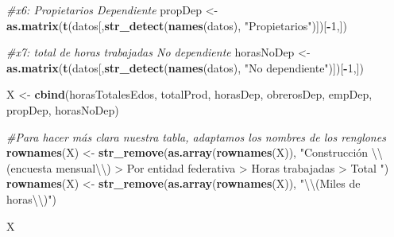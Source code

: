 \documentclass[
]{article}
\newenvironment{Shaded}{\begin{snugshade}}{\end{snugshade}}
\newcommand{\CharTok}[1]{\textcolor[rgb]{0.31,0.60,0.02}{#1}}
\newcommand{\CommentTok}[1]{\textcolor[rgb]{0.56,0.35,0.01}{\textit{#1}}}
\newcommand{\DecValTok}[1]{\textcolor[rgb]{0.00,0.00,0.81}{#1}}
\newcommand{\KeywordTok}[1]{\textcolor[rgb]{0.13,0.29,0.53}{\textbf{#1}}}
\newcommand{\NormalTok}[1]{#1}
\newcommand{\OperatorTok}[1]{\textcolor[rgb]{0.81,0.36,0.00}{\textbf{#1}}}
\newcommand{\StringTok}[1]{\textcolor[rgb]{0.31,0.60,0.02}{#1}}
\begin{document}
\begin{Shaded}
\begin{Highlighting}[]
\CommentTok{#x6: Propietarios Dependiente}
\NormalTok{propDep <-}\StringTok{ }\KeywordTok{as.matrix}\NormalTok{(}\KeywordTok{t}\NormalTok{(datos[,}\KeywordTok{str_detect}\NormalTok{(}\KeywordTok{names}\NormalTok{(datos), }\StringTok{"Propietarios"}\NormalTok{)])[}\OperatorTok{-}\DecValTok{1}\NormalTok{,])}

\CommentTok{#x7: total de horas trabajadas No dependiente}
\NormalTok{horasNoDep <-}\StringTok{ }\KeywordTok{as.matrix}\NormalTok{(}\KeywordTok{t}\NormalTok{(datos[,}\KeywordTok{str_detect}\NormalTok{(}\KeywordTok{names}\NormalTok{(datos), }\StringTok{"No dependiente"}\NormalTok{)])[}\OperatorTok{-}\DecValTok{1}\NormalTok{,])}

\NormalTok{X <-}\StringTok{ }\KeywordTok{cbind}\NormalTok{(horasTotalesEdos, totalProd, horasDep, obrerosDep, empDep, propDep, horasNoDep)}

\CommentTok{#Para hacer más clara nuestra tabla, adaptamos los nombres de los renglones}
\KeywordTok{rownames}\NormalTok{(X) <-}\StringTok{ }\KeywordTok{str_remove}\NormalTok{(}\KeywordTok{as.array}\NormalTok{(}\KeywordTok{rownames}\NormalTok{(X)), }\StringTok{"Construcción }\CharTok{\textbackslash{}\textbackslash{}}\StringTok{(encuesta mensual}\CharTok{\textbackslash{}\textbackslash{}}\StringTok{) > Por entidad federativa > Horas trabajadas > Total "}\NormalTok{)}
\KeywordTok{rownames}\NormalTok{(X) <-}\StringTok{ }\KeywordTok{str_remove}\NormalTok{(}\KeywordTok{as.array}\NormalTok{(}\KeywordTok{rownames}\NormalTok{(X)), }\StringTok{"}\CharTok{\textbackslash{}\textbackslash{}}\StringTok{(Miles de horas}\CharTok{\textbackslash{}\textbackslash{}}\StringTok{)"}\NormalTok{)}

\NormalTok{X}
\end{Highlighting}
\end{Shaded}
\end{document}
